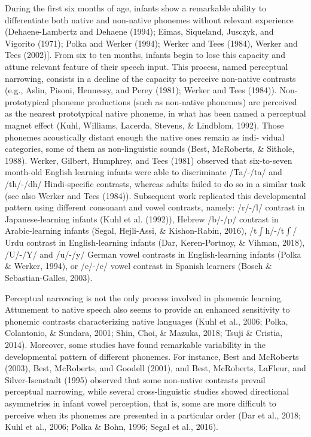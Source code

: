 \documentclass[man,floatsintext]{apa6}
\begin{document}
During the first six months of age, infants show a remarkable ability to differentiate both native and non-native phonemes without relevant experience (Dehaene-Lambertz and Dehaene (1994); Eimas, Siqueland, Jusczyk, and Vigorito (1971); Polka and Werker (1994); Werker and Tees (1984), Werker and Tees (2002){]}. From six to ten months, infants begin to lose this capacity and attune relevant feature of their speech input. This process, named perceptual narrowing, consists in a decline of the capacity to perceive non-native contrasts (e.g., Aslin, Pisoni, Hennessy, and Perey (1981); Werker and Tees (1984)). Non-prototypical phoneme productions (such as non-native phonemes) are perceived as the nearest prototypical native phoneme, in what has been named a perceptual magnet effect (Kuhl, Williams, Lacerda, Stevens, \& Lindblom, 1992). Those phonemes acoustically distant enough the native ones remain as indi- vidual categories, some of them as non-linguistic sounds (Best, McRoberts, \& Sithole, 1988). Werker, Gilbert, Humphrey, and Tees (1981) observed that six-to-seven month-old English learning infants were able to discriminate /Ta/-/ta/ and /th/-/dh/ Hindi-specific contrasts, whereas adults failed to do so in a similar task (see also Werker and Tees (1984)). Subsequent work replicated this developmental pattern using different consonant and vowel contrasts, namely: /r/-/l/ contrast in Japanese-learning infants (Kuhl et al. (1992)), Hebrew /b/-/p/ contrast in Arabic-learning infants (Segal, Hejli-Assi, \& Kishon-Rabin, 2016), /t\(\int\)h/-/t\(\int\)/ Urdu contrast in English-learning infants (Dar, Keren-Portnoy, \& Vihman, 2018), /U/-/Y/ and /u/-/y/ German vowel contrasts in English-learning infants (Polka \& Werker, 1994), or /e/-/e/ vowel contrast in Spanish learners (Bosch \& Sebastian-Galles, 2003).

Perceptual narrowing is not the only process involved in phonemic learning. Attunement to native speech also seems to provide an enhanced sensitivity to phonemic contrasts characterizing native languages (Kuhl et al., 2006; Polka, Colantonio, \& Sundara, 2001; Shin, Choi, \& Mazuka, 2018; Tsuji \& Cristia, 2014). Moreover, some studies have found remarkable variability in the developmental pattern of different phonemes. For instance, Best and McRoberts (2003), Best, McRoberts, and Goodell (2001), and Best, McRoberts, LaFleur, and Silver-Isenstadt (1995) observed that some non-native contrasts prevail perceptual narrowing, while several cross-linguistic studies showed directional asymmetries in infant vowel perception, that is, some are more difficult to perceive when its phonemes are presented in a particular order (Dar et al., 2018; Kuhl et al., 2006; Polka \& Bohn, 1996; Segal et al., 2016).
\end{document}

